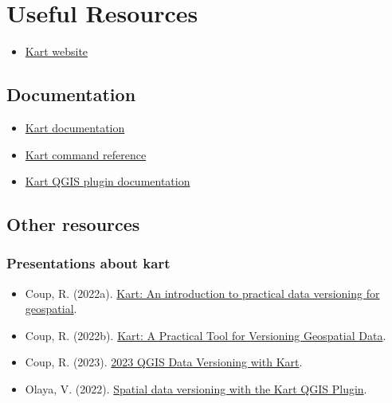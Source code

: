 \documentclass[
  letterpaper,
  DIV=11,
  numbers=noendperiod]{scrartcl}
\providecommand{\tightlist}{%
  \setlength{\itemsep}{0pt}\setlength{\parskip}{0pt}}\usepackage{longtable,booktabs,array}
\begin{document}
\section{Useful Resources}\label{sec-resources}

\begin{itemize}
\tightlist
\item
  \href{https://kartproject.org/}{Kart website}
\end{itemize}

\subsection{Documentation}\label{documentation}

\begin{itemize}
\item
  \href{https://docs.kartproject.org/en/latest/index.html}{Kart
  documentation}
\item
  \href{https://docs.kartproject.org/en/latest/pages/command_reference.html}{Kart
  command reference}
\item
  \href{https://github.com/koordinates/kart-qgis-plugin/blob/main/docs/index.md\#kart-plugin-user-documentation}{Kart
  QGIS plugin documentation}
\end{itemize}

\subsection{Other resources}\label{other-resources}

\subsubsection{Presentations about kart}\label{presentations-about-kart}

\begin{itemize}
\item
  Coup, R. (2022a).
  \href{https://www.youtube.com/watch?v=fAIh6p4rczY}{Kart: An
  introduction to practical data versioning for geospatial}.
\item
  Coup, R. (2022b).
  \href{https://www.youtube.com/watch?v=_7ETwmMlUtY}{Kart: A Practical
  Tool for Versioning Geospatial Data}.
\item
  Coup, R. (2023).
  \href{https://www.youtube.com/watch?v=AxOTE2CCY3s}{2023 QGIS Data
  Versioning with Kart}.
\item
  Olaya, V. (2022).
  \href{https://www.youtube.com/watch?v=aABc3JrgJUY}{Spatial data
  versioning with the Kart QGIS Plugin}.
\end{itemize}
\end{document}
